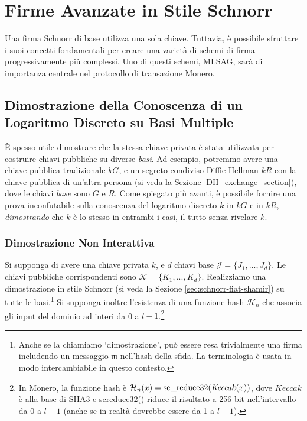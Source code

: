 \chapter{Firme Avanzate in Stile Schnorr}
\label{chapter:advanced-schnorr}

Una firma Schnorr di base utilizza una sola chiave. Tuttavia, è possibile sfruttare i suoi concetti fondamentali per creare una varietà di schemi di firma progressivamente più complessi. Uno di questi schemi, MLSAG, sarà di importanza centrale nel protocollo di transazione Monero.



\section{Dimostrazione della Conoscenza di un Logaritmo Discreto su Basi Multiple}
\label{sec:proofs-discrete-logarithm-multiple-bases}

È spesso utile dimostrare che la stessa chiave privata è stata utilizzata per costruire chiavi pubbliche su diverse \emph{basi}. Ad esempio, potremmo avere una chiave pubblica tradizionale $k G$, e un segreto condiviso Diffie-Hellman $k R$ con la chiave pubblica di un'altra persona (si veda la Sezione \ref{DH_exchange_section}), dove le chiavi \emph{base} sono $G$ e $R$. Come spiegato più avanti, è possibile fornire una prova inconfutabile sulla conoscenza del logaritmo discreto $k$ in $k G$ e in $k R$, \emph{dimostrando} che $k$ è lo stesso in entrambi i casi, il tutto senza rivelare $k$.


\subsection*{Dimostrazione Non Interattiva}

Si supponga di avere una chiave privata $k$, e $d$ chiavi base $\mathcal{J} = \{J_1,...,J_d\}$. Le chiavi pubbliche corrispondenti sono $\mathcal{K} = \{K_1,...,K_d\}$. Realizziamo una dimostrazione in stile Schnorr (si veda la Sezione \ref{sec:schnorr-fiat-shamir}) su tutte le basi.\footnote{Anche se la chiamiamo `dimostrazione', può essere resa trivialmente una firma includendo un messaggio $\mathfrak{m}$ nell’hash della sfida. La terminologia è usata in modo intercambiabile in questo contesto.} Si supponga inoltre l’esistenza di una funzione hash \(\mathcal{H}_n\) 
che associa gli input del dominio ad interi da 0 a $l-1$.\footnote{In Monero, la funzione hash è $\mathcal{H}_n(x) = \textrm{sc\textunderscore reduce32}(\mathit{Keccak}(x))$, dove $\mathit{Keccak}$ è alla base di SHA3 e sc\textunderscore reduce32() riduce il risultato a 256 bit nell’intervallo da 0 a $l-1$ (anche se in realtà dovrebbe essere da 1 a $l-1$).} 


